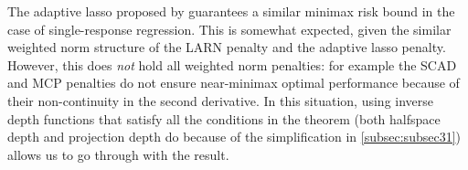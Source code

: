 The adaptive lasso proposed by \cite{Zou06} guarantees a similar minimax risk bound in the case of single-response regression. This is somewhat expected, given the similar weighted norm structure of the LARN penalty and the adaptive lasso penalty. However, this does \textit{not} hold all weighted norm penalties: for example the SCAD and MCP penalties do not ensure near-minimax optimal performance because of their non-continuity in the second derivative. In this situation, using inverse depth functions that satisfy all the conditions in the theorem (both halfspace depth and projection depth do because of the simplification in \ref{subsec:subsec31}) allows us to go through with the result.

%
%
%
